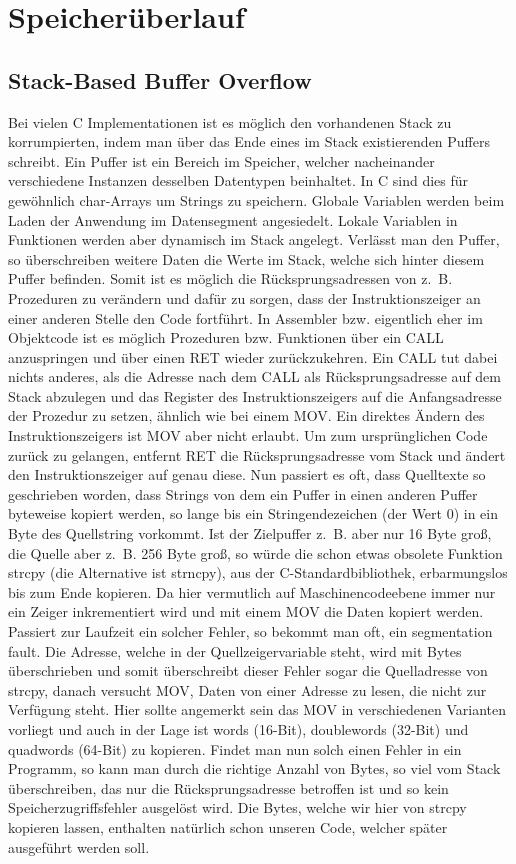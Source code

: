 \documentclass[12pt]{book}
\begin{document}
\chapter{Speicherüberlauf}

\section{Stack-Based Buffer Overflow}
Bei vielen C Implementationen ist es möglich den vorhandenen Stack zu
korrumpierten, indem man über das Ende eines im Stack existierenden Puffers
schreibt. Ein Puffer ist ein Bereich im Speicher, welcher nacheinander
verschiedene Instanzen desselben Datentypen beinhaltet. In C sind dies für
gewöhnlich char-Arrays um Strings zu speichern. Globale Variablen werden beim
Laden der Anwendung im Datensegment angesiedelt. Lokale Variablen in Funktionen
werden aber dynamisch im Stack angelegt. Verlässt man den Puffer, so
überschreiben weitere Daten die Werte im Stack, welche sich hinter diesem Puffer
befinden. Somit ist es möglich die Rücksprungsadressen von z. B. Prozeduren zu
verändern und dafür zu sorgen, dass der Instruktionszeiger an einer anderen
Stelle den Code fortführt. In Assembler bzw. eigentlich eher im Objektcode ist
es möglich Prozeduren bzw. Funktionen über ein CALL anzuspringen und über einen
RET wieder zurückzukehren. Ein CALL tut dabei nichts anderes, als die Adresse
nach dem CALL als Rücksprungsadresse auf dem Stack abzulegen und das Register
des Instruktionszeigers auf die Anfangsadresse der Prozedur zu setzen, ähnlich
wie bei einem MOV. Ein direktes Ändern des Instruktionszeigers ist MOV aber
nicht erlaubt. Um zum ursprünglichen Code zurück zu gelangen, entfernt RET die
Rücksprungsadresse vom Stack und ändert den Instruktionszeiger auf genau
diese. Nun passiert es oft, dass Quelltexte so geschrieben worden, dass Strings
von dem ein Puffer in einen anderen Puffer byteweise kopiert werden, so lange
bis ein Stringendezeichen (der Wert 0) in ein Byte des Quellstring vorkommt.
Ist der Zielpuffer z. B. aber nur 16 Byte groß, die Quelle aber z. B. 256 Byte
groß, so würde die schon etwas obsolete Funktion strcpy (die Alternative ist
strncpy), aus der C-Standardbibliothek, erbarmungslos bis zum Ende kopieren.
Da hier vermutlich auf Maschinencodeebene immer nur ein Zeiger inkrementiert
wird und mit einem MOV die Daten kopiert werden. Passiert zur Laufzeit ein
solcher Fehler, so bekommt man oft, ein segmentation fault. Die Adresse, welche
in der Quellzeigervariable steht, wird mit Bytes überschrieben und somit
überschreibt dieser Fehler sogar die Quelladresse von strcpy, danach versucht
MOV, Daten von einer Adresse zu lesen, die nicht zur Verfügung steht. Hier sollte
angemerkt sein das MOV in verschiedenen Varianten vorliegt und auch in der Lage
ist words (16-Bit), doublewords (32-Bit) und quadwords (64-Bit) zu kopieren.
Findet man nun solch einen Fehler in ein Programm, so kann man durch die
richtige Anzahl von Bytes, so viel vom Stack überschreiben, das nur die
Rücksprungsadresse betroffen ist und so kein Speicherzugriffsfehler ausgelöst
wird. Die Bytes, welche wir hier von strcpy kopieren lassen, enthalten natürlich
schon unseren Code, welcher später ausgeführt werden soll.
\end{document}
